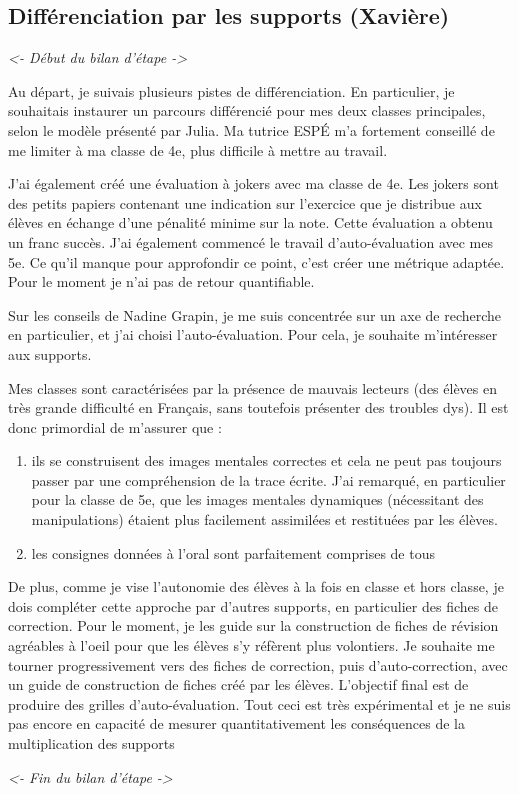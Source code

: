 \subsection{Différenciation par les supports (Xavière)}

\textit{<- Début du bilan d'étape ->}

Au départ, je suivais plusieurs pistes de différenciation. En particulier, je souhaitais instaurer un parcours différencié pour mes deux classes principales, selon le modèle présenté par Julia. Ma tutrice ESPÉ m’a fortement conseillé de me limiter à ma classe de 4e, plus difficile à mettre au travail.

J’ai également créé une évaluation à jokers avec ma classe de 4e. Les jokers sont des petits papiers contenant une indication sur l’exercice que je distribue aux élèves en échange d’une pénalité minime sur la note. Cette évaluation a obtenu un franc succès.
J’ai également commencé le travail d’auto-évaluation avec mes 5e. Ce qu’il manque pour approfondir ce point, c’est créer une métrique adaptée. Pour le moment je n’ai pas de retour quantifiable.

Sur les conseils de Nadine Grapin, je me suis concentrée sur un axe de recherche en particulier, et j’ai choisi l’auto-évaluation. Pour cela, je souhaite m’intéresser aux supports.

Mes classes sont caractérisées par la présence de mauvais lecteurs (des élèves en très grande difficulté en Français, sans toutefois présenter des troubles dys). Il est donc primordial de m’assurer que :
\begin{enumerate}
    \item ils se construisent des images mentales correctes et cela ne peut pas toujours passer par une compréhension de la trace écrite. J’ai remarqué, en particulier pour la classe de 5e, que les images mentales dynamiques (nécessitant des manipulations) étaient plus facilement assimilées et restituées par les élèves.
    \item les consignes données à l’oral sont parfaitement comprises de tous
\end{enumerate}

De plus, comme je vise l’autonomie des élèves à la fois en classe et hors classe, je dois compléter cette approche par d’autres supports, en particulier des fiches de correction. Pour le moment, je les guide sur la construction de fiches de révision agréables à l’oeil pour que les élèves s’y réfèrent plus volontiers. Je souhaite me tourner progressivement vers des fiches de correction, puis d’auto-correction, avec un guide de construction de fiches créé par les élèves. L’objectif final est de produire des grilles d’auto-évaluation.
Tout ceci est très expérimental et je ne suis pas encore en capacité de mesurer quantitativement les conséquences de la multiplication des supports

\textit{<- Fin du bilan d'étape ->}